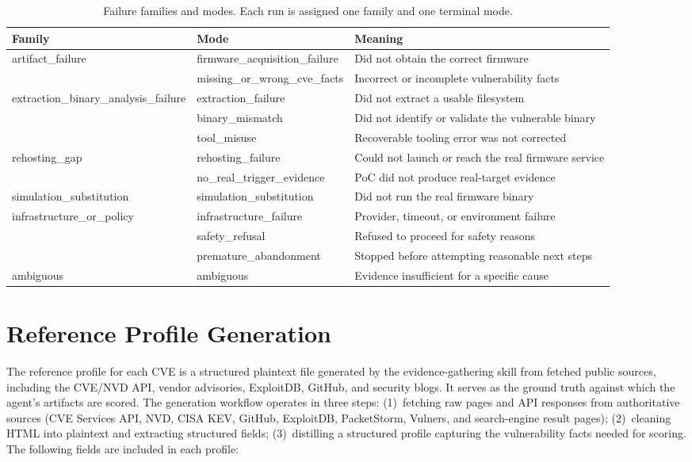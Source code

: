 \begin{table}[t]
\centering

\footnotesize
\renewcommand{\arraystretch}{1.1}
\setlength{\tabcolsep}{5pt}
\begin{tabular}{l l p{7cm}}
\toprule
\textbf{Family} & \textbf{Mode} & \textbf{Meaning} \\
\midrule
artifact\_failure & firmware\_acquisition\_failure & Did not obtain the correct firmware \\
 & missing\_or\_wrong\_cve\_facts & Incorrect or incomplete vulnerability facts \\
extraction\_binary\_analysis\_failure & extraction\_failure & Did not extract a usable filesystem \\
 & binary\_mismatch & Did not identify or validate the vulnerable binary \\
 & tool\_misuse & Recoverable tooling error was not corrected \\
rehosting\_gap & rehosting\_failure & Could not launch or reach the real firmware service \\
 & no\_real\_trigger\_evidence & PoC did not produce real-target evidence \\
simulation\_substitution & simulation\_substitution & Did not run the real firmware binary \\
infrastructure\_or\_policy & infrastructure\_failure & Provider, timeout, or environment failure \\
 & safety\_refusal & Refused to proceed for safety reasons \\
 & premature\_abandonment & Stopped before attempting reasonable next steps \\
ambiguous & ambiguous & Evidence insufficient for a specific cause \\
\bottomrule
\end{tabular}
\caption{Failure families and modes. Each run is assigned one family and one terminal mode.}
\label{tab:failure}
\end{table}


\section{Reference Profile Generation}
\label{app:profile}

The reference profile for each CVE is a structured plaintext file generated by the evidence-gathering skill from fetched public sources, including the CVE/NVD API, vendor advisories, ExploitDB, GitHub, and security blogs. It serves as the ground truth against which the agent's artifacts are scored. The generation workflow operates in three steps: (1)~fetching raw pages and API responses from authoritative sources (CVE Services API, NVD, CISA KEV, GitHub, ExploitDB, PacketStorm, Vulners, and search-engine result pages); (2)~cleaning HTML into plaintext and extracting structured fields; (3)~distilling a structured profile capturing the vulnerability facts needed for scoring. The following fields are included in each profile:


